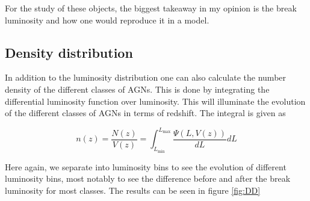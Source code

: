 \documentclass{article}
\begin{document}
For the study of these objects, the biggest takeaway in my opinion is the break luminosity and how one would reproduce it in a model. 



\subsection{Density distribution}

In addition to the luminosity distribution one can also calculate the number density of the different classes of AGNs. This is done by integrating the
differential luminosity function over luminosity. This will illuminate the evolution of the different classes of AGNs in terms of redshift. The integral is given as

\begin{equation}
    n(z) =\frac{N(z)}{V(z)} =  \int_{L_{\text{min}}}^{L_{\text{max}}} \frac{\Psi(L, V(z))}{dL} dL
\end{equation}

Here again, we separate into luminosity bins to see the evolution of different luminosity bins, most notably to see the difference before and after the break luminosity for most classes. 
The results can be seen in figure \ref*{fig:DD}






\end{document}

